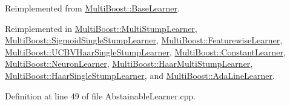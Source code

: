 Reimplemented from \hyperlink{classMultiBoost_1_1BaseLearner_ab67f4944b1967c7141982b5d47720620}{Multi\-Boost\-::\-Base\-Learner}.



Reimplemented in \hyperlink{classMultiBoost_1_1MultiStumpLearner_a61d17e2ac24c475f7d11e03abcb2e1de}{Multi\-Boost\-::\-Multi\-Stump\-Learner}, \hyperlink{classMultiBoost_1_1SigmoidSingleStumpLearner_aff4444f4cce780b47db79650b778b685}{Multi\-Boost\-::\-Sigmoid\-Single\-Stump\-Learner}, \hyperlink{classMultiBoost_1_1FeaturewiseLearner_a355e35d792aaae83f9e639b8cb5ab2a4}{Multi\-Boost\-::\-Featurewise\-Learner}, \hyperlink{classMultiBoost_1_1UCBVHaarSingleStumpLearner_aedbbd65aa2801237f3a6dc3a46e43997}{Multi\-Boost\-::\-U\-C\-B\-V\-Haar\-Single\-Stump\-Learner}, \hyperlink{classMultiBoost_1_1ConstantLearner_a02a3a2a863ec66ac0843eb866fbff1d1}{Multi\-Boost\-::\-Constant\-Learner}, \hyperlink{classMultiBoost_1_1NeuronLearner_a8c38489a59616866afbbc9d7ad60fee5}{Multi\-Boost\-::\-Neuron\-Learner}, \hyperlink{classMultiBoost_1_1HaarMultiStumpLearner_af9cc0a38d034aa794af315ee5299691f}{Multi\-Boost\-::\-Haar\-Multi\-Stump\-Learner}, \hyperlink{classMultiBoost_1_1HaarSingleStumpLearner_ad994400056663aa2c030fbafaf96ca22}{Multi\-Boost\-::\-Haar\-Single\-Stump\-Learner}, and \hyperlink{classMultiBoost_1_1AdaLineLearner_a6c8f143382449c333995c33539bbff04}{Multi\-Boost\-::\-Ada\-Line\-Learner}.



Definition at line 49 of file Abstainable\-Learner.\-cpp.

